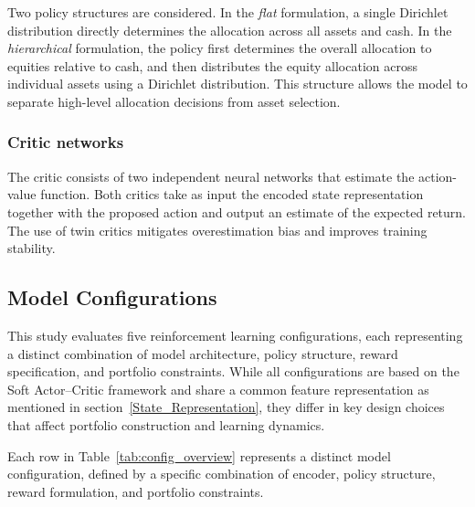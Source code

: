 \documentclass[]{elsarticle}
\begin{document}
Two policy structures are considered. In the \textit{flat} formulation, a single Dirichlet distribution directly determines the allocation across all assets and cash. In the \textit{hierarchical} formulation, the policy first determines the overall allocation to equities relative to cash, and then distributes the equity allocation across individual assets using a Dirichlet distribution. This structure allows the model to separate high-level allocation decisions from asset selection.

\subsubsection{Critic networks}
The critic consists of two independent neural networks that estimate the action-value function. Both critics take as input the encoded state representation together with the proposed action and output an estimate of the expected return. The use of twin critics mitigates overestimation bias and improves training stability.

\hypertarget{Model-Configurations}{%
\subsection{Model Configurations}\label{Model-Configurations}}

This study evaluates five reinforcement learning configurations, each representing a distinct combination of model architecture, policy structure, reward specification, and portfolio constraints. While all configurations are based on the Soft Actor--Critic framework and share a common feature representation as mentioned in section~\ref{State_Representation}, they differ in key design choices that affect portfolio construction and learning dynamics.

Each row in Table~\ref{tab:config_overview} represents a distinct model configuration, defined by a specific combination of encoder, policy structure, reward formulation, and portfolio constraints.
\end{document}
